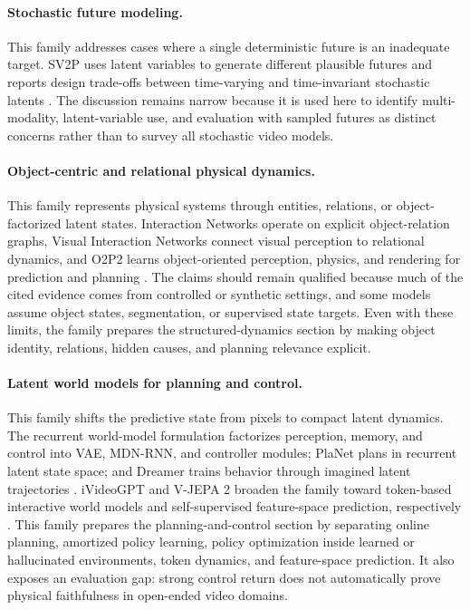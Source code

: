 \paragraph{Stochastic future modeling.}
This family addresses cases where a single deterministic future is an inadequate target. SV2P uses latent variables to generate different plausible futures and reports design trade-offs between time-varying and time-invariant stochastic latents \cite{babaeizadeh2018_sv2p_prov}. The discussion remains narrow because it is used here to identify multi-modality, latent-variable use, and evaluation with sampled futures as distinct concerns rather than to survey all stochastic video models.

\paragraph{Object-centric and relational physical dynamics.}
This family represents physical systems through entities, relations, or object-factorized latent states. Interaction Networks operate on explicit object-relation graphs, Visual Interaction Networks connect visual perception to relational dynamics, and O2P2 learns object-oriented perception, physics, and rendering for prediction and planning \cite{battaglia2016_interaction_networks_prov,watters2017_visual_interaction_networks_prov,janner2019_o2p2_prov}. The claims should remain qualified because much of the cited evidence comes from controlled or synthetic settings, and some models assume object states, segmentation, or supervised state targets. Even with these limits, the family prepares the structured-dynamics section by making object identity, relations, hidden causes, and planning relevance explicit.

\paragraph{Latent world models for planning and control.}
This family shifts the predictive state from pixels to compact latent dynamics. The recurrent world-model formulation factorizes perception, memory, and control into VAE, MDN-RNN, and controller modules; PlaNet plans in recurrent latent state space; and Dreamer trains behavior through imagined latent trajectories \cite{ha2018_world_models_prov,hafner2019_planet_prov,hafner2020_dreamer_prov}. iVideoGPT and V-JEPA 2 broaden the family toward token-based interactive world models and self-supervised feature-space prediction, respectively \cite{wu2024ivideogpt,assran2025vjepa2_prov}. This family prepares the planning-and-control section by separating online planning, amortized policy learning, policy optimization inside learned or hallucinated environments, token dynamics, and feature-space prediction. It also exposes an evaluation gap: strong control return does not automatically prove physical faithfulness in open-ended video domains.

